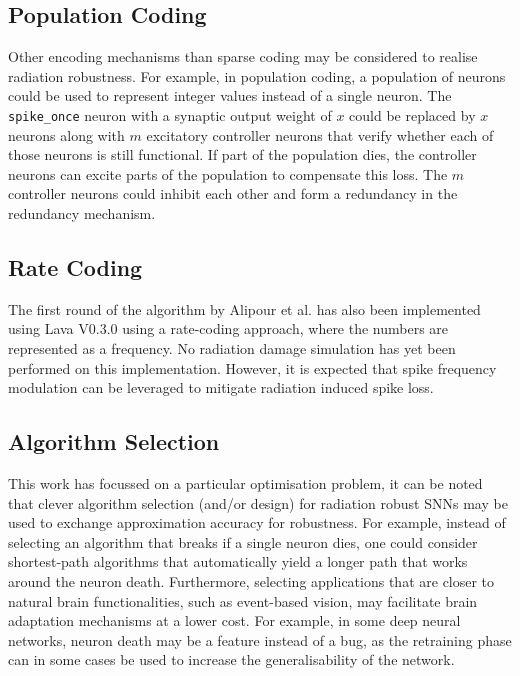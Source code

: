 \subsection*{Population Coding}\label{subsec:population_coding}
Other encoding mechanisms than sparse coding may be considered to realise radiation robustness. For example,  in population coding, a population of neurons could be used to represent integer values instead of a single neuron. The \verb+spike_once+ neuron with a synaptic output weight of $x$ could be replaced by $x$ neurons along with $m$ excitatory controller neurons that verify whether each of those neurons is still functional. If part of the population dies, the controller neurons can excite parts of the population to compensate this loss. The $m$ controller neurons could inhibit each other and form a redundancy in the redundancy mechanism.

\subsection*{Rate Coding}\label{subsec:rate_coding}
The first round of the algorithm by Alipour et al. has also been implemented using Lava V0.3.0 using a rate-coding approach, where the numbers are represented as a frequency. No radiation damage simulation has yet been performed on this implementation. However, it is expected that spike frequency modulation can be leveraged to mitigate radiation induced spike loss.

\subsection*{Algorithm Selection}\label{subsec:algorithm_selection}
This work has focussed on a particular optimisation problem, it can be noted that clever algorithm selection (and/or design) for radiation robust SNNs may be used to exchange approximation accuracy for robustness. For example, instead of selecting an algorithm that breaks if a single neuron dies, one could consider shortest-path algorithms that automatically yield a longer path that works around the neuron death. Furthermore, selecting applications that are closer to natural brain functionalities, such as event-based vision, may facilitate brain adaptation mechanisms at a lower cost. For example, in some deep neural networks, neuron death may be a feature instead of a bug, as the retraining phase can in some cases be used to increase the generalisability of the network. %

